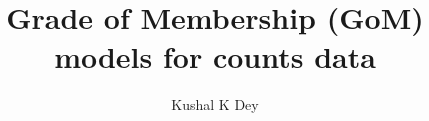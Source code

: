 \documentclass{beamer}\usepackage[]{graphicx}\usepackage[]{color}
\title{Grade of Membership (GoM) models for counts data}
\author{Kushal K Dey}
\date{}
\begin{document}





\begin{frame}{}
\maketitle
\end{frame}

\end{document}
